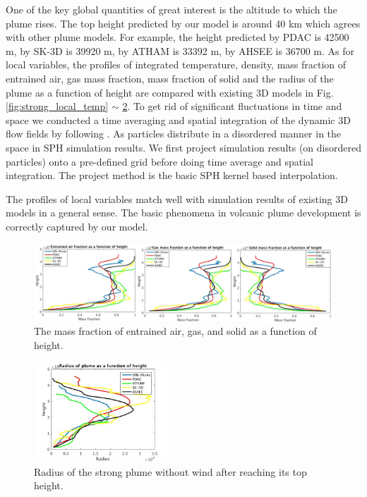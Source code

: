 \documentclass[journal abbreviation, manuscript]{copernicus}
\begin{document}
One of the key global quantities of great interest is the altitude to which the plume rises. The top height predicted by our model is around 40 km which agrees with other plume models. For example, the height predicted by PDAC is 42500 m, by SK-3D is 39920 m, by ATHAM is 33392 m, by AHSEE is 36700 m. As for local variables, the profiles of integrated temperature, density, mass fraction of entrained air, gas mass fraction, mass fraction of solid and the radius of the plume as a function of height are compared with existing 3D models in Fig. \ref{fig:strong_local_temp} $\sim$ \ref{fig:strong_local_radius}. To get rid of significant fluctuations in time and space we conducted a time averaging and spatial integration of the dynamic 3D flow fields by following \citet {cerminara2016large}.
As particles distribute in a disordered manner in the space in SPH simulation results. We first project simulation results (on disordered particles) onto a pre-defined grid before doing time average and spatial integration. The project method is the basic SPH kernel based interpolation.

The profiles of local variables match well with simulation results of existing 3D models in a general sense. The basic phenomena in volcanic plume development is correctly captured by our model.

\begin{figure}
\includegraphics[width=15cm]{msfrac}
\caption{The mass fraction of entrained air, gas, and solid as a function of height.}
\label{fig:strong_plume_mass_fraction}
\end{figure}
%

\begin{figure}
\center
\includegraphics[width=5cm]{radius_strong}
\caption{Radius of the strong plume without wind after reaching its top height.}
\label{fig:strong_local_radius}
\end{figure}
\end{document}

